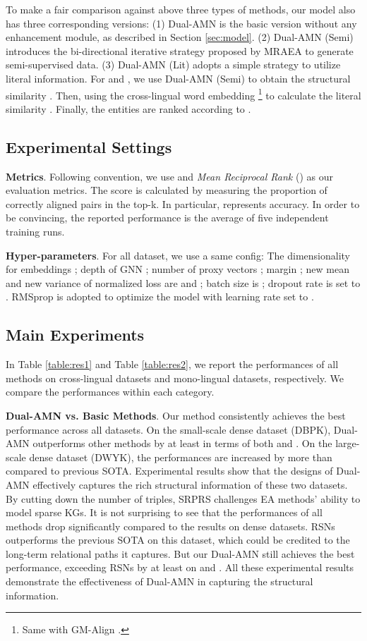 \documentclass[sigconf]{acmart}
\begin{document}
To make a fair comparison against above three types of methods, our model also has three corresponding versions:
(1) Dual-AMN is the basic version without any enhancement module, as described in Section \ref{sec:model}.
(2) Dual-AMN (Semi) introduces the bi-directional iterative strategy proposed by MRAEA to generate semi-supervised data.
(3) Dual-AMN (Lit) adopts a simple strategy to utilize literal information.
For  and , we use Dual-AMN (Semi) to obtain the structural similarity .
Then, using the cross-lingual word embedding \footnote{Same with GM-Align \cite{DBLP:conf/iclr/LampleCRDJ18}.} to calculate the literal similarity .
Finally, the entities are ranked according to .

\subsection{Experimental Settings}
\textbf{Metrics}.
Following convention, we use  and \emph{Mean Reciprocal Rank} () as our evaluation metrics.
The  score is calculated by measuring the proportion of correctly aligned pairs in the top-k.
In particular,  represents accuracy.
In order to be convincing, the reported performance is the average of five independent training runs.


\noindent
\textbf{Hyper-parameters}.
For all dataset, we use a same config:
The dimensionality for embeddings ;
depth of GNN ;
number of proxy vectors ;
margin ;
new mean and new variance of normalized loss are  and ;
batch size is ; dropout rate is set to .
RMSprop is adopted to optimize the model with learning rate set to .


\subsection{Main Experiments}
In Table \ref{table:res1} and Table \ref{table:res2}, we report the performances of all methods on cross-lingual datasets and mono-lingual datasets, respectively.
We compare the performances within each category.

\noindent
\textbf{Dual-AMN vs. Basic Methods}.
Our method consistently achieves the best performance across all datasets.
On the small-scale dense dataset (DBPK), Dual-AMN outperforms other methods by at least  in terms of both  and .
On the large-scale dense dataset (DWYK), the performances are increased by more than  compared to previous SOTA.
Experimental results show that the designs of Dual-AMN effectively captures the rich structural information of these two datasets.
By cutting down the number of triples, SRPRS challenges EA methods' ability to model sparse KGs.
It is not surprising to see that the performances of all methods drop significantly compared to the results on dense datasets.
RSNs outperforms the previous SOTA on this dataset, which could be credited to the long-term relational paths it captures.
But our Dual-AMN still achieves the best performance, exceeding RSNs by at least  on  and .
All these experimental results demonstrate the effectiveness of Dual-AMN in capturing the structural information.
\end{document}
